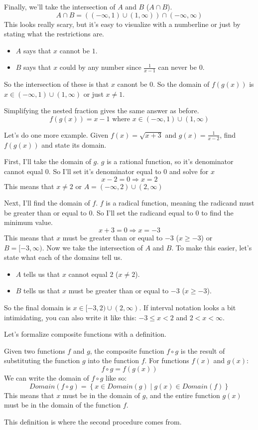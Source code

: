 Finally, we'll take the intersection of $A$ and $B$ ($A \cap B$).
\[
A \cap B = \left((-\infty, 1) \cup (1, \infty) \right) \cap (-\infty, \infty)
\]
This looks really scary, but it's easy to visualize with a numberline or just by stating what the restrictions are.
\begin{itemize}
    \item $A$ says that $x$ cannot be $1$.
    \item $B$ says that $x$ could by any number since $\frac{1}{x - 1}$ can never be $0$.
\end{itemize}
So the intersection of these is that $x$ canont be $0$. So the domain of $f(g(x))$ is $x \in (-\infty, 1) \cup (1, \infty)$ or just $x \neq 1$.

Simplifying the nested fraction gives the same answer as before.
\[
f(g(x)) = x - 1 \text{ where } x \in (-\infty, 1) \cup (1, \infty)
\]

Let's do one more example. Given $f(x) = \sqrt{x + 3}$ and $g(x) = \frac{1}{x - 2}$, find $f(g(x))$ and state its domain.

First, I'll take the domain of $g$. $g$ is a rational function, so it's denominator cannot equal $0$. So I'll set it's denominator equal to $0$ and solve for $x$
\[
x - 2 = 0 \Longrightarrow x = 2
\]
This means that $x \neq 2$ or $A = (-\infty, 2) \cup (2, \infty)$

Next, I'll find the domain of $f$. $f$ is a radical function, meaning the radicand must be greater than or equal to $0$. So I'll set the radicand equal to $0$ to find the minimum value.
\[
x + 3 = 0 \Longrightarrow x = -3
\]
This means that $x$ must be greater than or equal to $-3$ ($x \ge -3$) or \\$B = [-3, \infty)$.
\clearpage
Now we take the intersection of $A$ and $B$. To make this easier, let's state what each of the domains tell us.
\begin{itemize}
    \item $A$ tells us that $x$ cannot equal $2$ ($x \neq 2$).
    \item $B$ tells us that $x$ must be greater than or equal to $-3$ ($x \ge -3$).
\end{itemize}
So the final domain is $x \in [-3, 2) \cup (2, \infty)$. If interval notation looks a bit intimidating, you can also write it like this: $-3 \le x < 2$ and $2 < x < \infty$.

Let's formalize composite functions with a definition.
\begin{definition}
    Given two functions $f$ and $g$, the composite function $f \circ g$ is the result of substituting the function $g$ into the function $f$. For functions $f(x)$ and $g(x)$:
    \[
        f \circ g = f(g(x))
    \]
    We can write the domain of $f \circ g$ like so:
    \[
    Domain(f \circ g) = \left\{x \in Domain(g) \mid g(x) \in Domain(f) \right\}
    \]
    This means that $x$ must be in the domain of $g$, and the entire function $g(x)$ must be in the domain of the function $f$.
\end{definition}
This definition is where the second procedure comes from.

